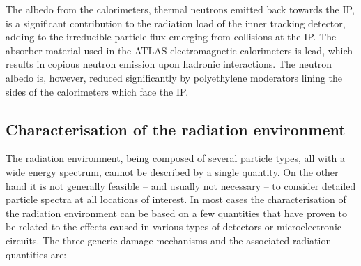 \documentclass[cernpreprint, atlasdraft=false, UKenglish,british,orcidlogo, texmf, orcidlogo]{atlasdoc}
\begin{document}
The albedo from the calorimeters, thermal neutrons emitted back towards the \gls{IP}, is a significant
contribution to the radiation load of the inner tracking detector, adding to the irreducible
particle flux emerging from collisions at the \gls{IP}. The absorber material
used in the ATLAS electromagnetic calorimeters is lead, which results in copious neutron emission
upon hadronic interactions. The neutron albedo is, however, reduced significantly by
polyethylene moderators lining the sides of the calorimeters which face the \gls{IP}.
 
\subsection{Characterisation of the radiation environment}
\label{sect:radDamMech}
 
The radiation environment, being composed of several particle types, all with a wide energy spectrum,
cannot be described by a single quantity. On the other hand it is not generally feasible -- and usually not
necessary -- to consider detailed particle spectra at all locations of interest.
In most cases the characterisation of the radiation environment can be based on a few quantities that have proven to
be related to the effects caused in various types of detectors or microelectronic circuits.
The three generic damage mechanisms and the associated radiation quantities are:
 
\end{document}
